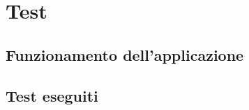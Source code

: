 \def \ti{\textit}
\def \bf{\textbf}

\chapter{Test}
	\label{cap:test}
	
\section{Funzionamento dell'applicazione}
	\label{sec:funzionamento}

\section{Test eseguiti}
	\label{sec:esperimenti}
